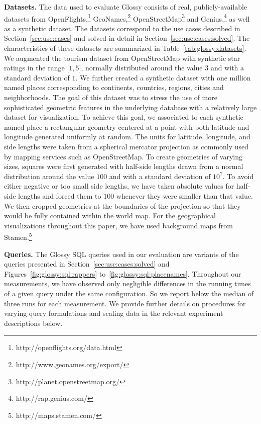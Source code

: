 \documentclass[11pt, oneside]{report}
\newcommand{\minisec}[1]{\noindent\textbf{#1.}}
\begin{document}
\minisec{Datasets}
The data used to evaluate Glossy consists of real, publicly-available datasets from OpenFlights,\footnote{http://openflights.org/data.html} GeoNames,\footnote{http://www.geonames.org/export/} OpenStreetMap\footnote{http://planet.openstreetmap.org/} and Genius,\footnote{http://rap.genius.com/} as well as a synthetic dataset. The datasets correspond to the use cases described in Section~\ref{sec:use:cases} and solved in detail in Section~\ref{sec:use:cases:solved}. The characteristics of these datasets are summarized in Table~\ref{tab:glossy:datasets}. We augmented the tourism dataset from OpenStreetMap with synthetic star ratings in the range $\lbrack 1, 5 \rbrack$, normally distributed around the value $3$ and with a standard deviation of $1$.  We further created a synthetic dataset with one million named places corresponding to continents, countries, regions, cities and neighborhoods. The goal of this dataset was to stress the use of more sophisticated geometric features in the underlying database with a relatively large dataset for visualization. To achieve this goal, we associated to each synthetic named place a rectangular geometry centered at a point with both latitude and longitude generated uniformly at random. The units for latitude, longitude, and side lengths were taken from a spherical mercator projection as commonly used by mapping services such as OpenStreetMap. To create geometries of varying sizes, squares were first generated with half-side lengths drawn from a normal distribution around the value $100$ and with a standard deviation of $10^7$. To avoid either negative or too small side lengths, we have taken absolute values for half-side lengths and forced them to $100$ whenever they were smaller than that value. We then cropped geometries at the boundaries of the projection so that they would be fully contained within the world map. For the geographical visualizations throughout this paper, we have used background maps from Stamen.\footnote{http://maps.stamen.com/}

\minisec{Queries}
The Glossy SQL queries used in our evaluation are variants of the queries presented in Section~\ref{sec:use:cases:solved} and Figures~\ref{fig:glossy:sql:rappers} to~\ref{fig:glossy:sql:placenames}. Throughout our measurements, we have observed only negligible differences in the running times of a given query under the same configuration. So we report below the median of three runs for each measurement. We provide further details on procedures for varying query formulations and scaling data in the relevant experiment descriptions below.  
\end{document}
